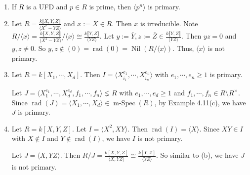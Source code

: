 \begin{example}
    \begin{enumerate}
        \item If $R$ is a UFD and $p \in R$ is prime, then $\langle p^{n} \rangle$ is primary.
        \item Let $R = \frac{k\llbracket X,Y ,Z \rrbracket}{\langle X^{2}-YZ \rangle}$ and $x := \overbar{X} \in R$. Then $x$ is irreducible. Note $R/\langle x \rangle = \frac{k\llbracket X,Y,Z \rrbracket}{\langle X^{2}-YZ \rangle}/\langle x \rangle \cong \frac{k\llbracket Y,Z \rrbracket}{\langle YZ \rangle}$. Let $y := \overbar{Y}, z := \overbar{Z} \in \frac{k\llbracket Y,Z \rrbracket}{\langle YZ \rangle}$. Then $yz = 0$ and $y,z \neq 0$. So $y,z \not \in (0) = \operatorname{rad}(0) = \operatorname{Nil}(R/\langle x \rangle)$. Thus, $\langle x \rangle$ is not primary.
        \item Let $R = k[X_1,\cdots,X_d]$. Then $I = \langle X_{i_1}^{e_1}, \cdots ,X_{i_n}^{e_n} \rangle$ with $e_1,\cdots,e_n \geq 1$ is primary. \par
            Let $J = \langle X_{1}^{e_1},\cdots,X_d^{e_d},f_1,\cdots,f_n \rangle \lneq R$ with $e_1,\cdots,e_d \geq 1$ and $f_1,\cdots,f_n \in R \setminus R^{\times}$. Since $\operatorname{rad}(J) = \langle X_{1},\cdots,X_d \rangle \in \operatorname{m-Spec}(R)$, by Example 4.11(c), we have $J$ is primary.
        \item Let $R = k[X,Y,Z]$. Let $I = \langle X^{2},XY\rangle$. Then $\operatorname{rad}(I) = \langle X \rangle$. Since $XY \in I$ with $X \not\in I$ and $Y \not\in \operatorname{rad}(I)$, we have $I$ is not primary. \par 
            Let $J = \langle X,YZ \rangle$. Then $R/J = \frac{k[X,Y,Z]}{\langle X,YZ \rangle} \cong \frac{k[Y,Z]}{\langle YZ \rangle}$. So similar to (b), we have $J$ is not primary.
    \end{enumerate}
\end{example}

